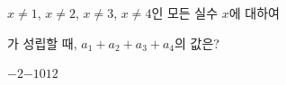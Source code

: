 \hspace*{2mm}\begin{minipage}[t]{\dimexpr\linewidth-2mm\relax}\vspace{0pt}
$x\ne 1$, $x\ne 2$, $x\ne 3$, $x\ne 4$인 모든 실수 $x$에 대하여\par\smallskip{}\par\smallskip\noindent 가 성립할 때, $a_1+a_2+a_3+a_4$의 값은? 
\begin{choices32}{$-2$}{$-1$}{$0$}{$1$}{$2$}\end{choices32}\end{minipage}
